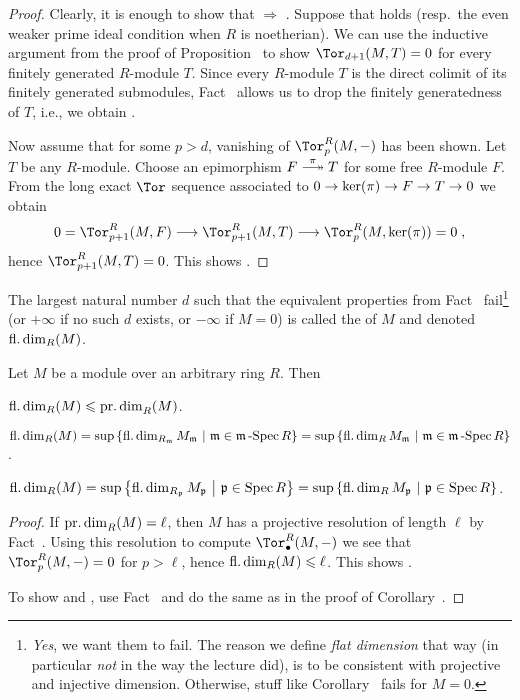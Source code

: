 \documentclass[a4paper,parskip=half,numbers=enddot, DIV=12]{scrreprt}
\renewcommand{\leq}{\leqslant}
\begin{document}
\begin{proof}
	Clearly, it is enough to show that  $\Rightarrow$ . Suppose that  holds (resp.\ the even weaker prime ideal condition when $R$ is noetherian). We can use the inductive argument from the proof of Proposition~ to show $\Tor_{d+1}(M,T)=0$ for every finitely generated $R$-module $T$. Since every $R$-module $T$ is the direct colimit of its finitely generated submodules, Fact~ allows us to drop the finitely generatedness of $T$, i.e., we obtain .
	
	Now assume that for some $p>d$, vanishing of $\Tor_p^R(M,-)$ has been shown. Let $T$ be any $R$-module. Choose an epimorphism $F\epimorphism[\pi]T$ for some free $R$-module $F$. From the long exact $\Tor$ sequence associated to $0\morphism \ker(\pi)\morphism F\morphism T\morphism 0$ we obtain
	\begin{align*}
		0=\Tor_{p+1}^R(M,F)\morphism\Tor_{p+1}^R(M,T)\morphism\Tor_p^R(M,\ker (\pi))=0\;,
	\end{align*}
	hence $\Tor_{p+1}^R(M,T)=0$. This shows .
\end{proof}
\begin{defi}
	The largest natural number $d$ such that the equivalent properties from Fact~ fail\footnote{\emph{Yes}, we want them to fail. The reason we define \emph{flat dimension} that way (in particular \emph{not} in the way the lecture did), is to be consistent with projective and injective dimension. Otherwise, stuff like Corollary~ fails for $M=0$.} (or $+\infty$ if no such $d$ exists, or $-\infty$ if $M=0$) is called the  of $M$ and denoted $\operatorname{fl.dim}_R(M)$.
\end{defi}
\begin{fact}
	Let $M$ be a module over an arbitrary ring $R$. Then
	\begin{alphanumerate}
		\item $\fdim_R(M)\leq \pdim_R(M)$.
		\item $\operatorname{fl.dim}_R(M)=\sup\left\{\operatorname{fl.dim}_{R_{\mathfrak{m}}}M_{\mathfrak{m}}\ \middle|\ \mathfrak{m}\in\mathfrak{m}\operatorname{-Spec} R\right\}=\sup\left\{\operatorname{fl.dim}_RM_{\mathfrak{m}}\ \middle|\  \mathfrak{m}\in\mathfrak{m}\operatorname{-Spec} R\right\}$.
		\item $\operatorname{fl.dim}_R(M)=\sup\left\{\operatorname{fl.dim}_{R_{\mathfrak{p}}}M_{\mathfrak{p}}\ \middle|\  \mathfrak{p}\in\operatorname{Spec} R\right\}=\sup\left\{\operatorname{fl.dim}_RM_{\mathfrak{p}}\ \middle|\  \mathfrak{p}\in\operatorname{Spec} R\right\}$.
	\end{alphanumerate}
\end{fact}
\begin{proof}
	If $\operatorname{pr.dim}_R(M)=\ell$, then $M$ has a projective resolution of length $\ell$ by Fact~. Using this resolution to compute $\Tor_\bullet^R(M,-)$ we see that $\Tor_p^R(M,-)=0$ for $p>\ell$, hence $\fdim_R(M)\leq \ell$. This shows .
	
	To show  and , use Fact~ and do the same as in the proof of Corollary~.
\end{proof}
\end{document}
